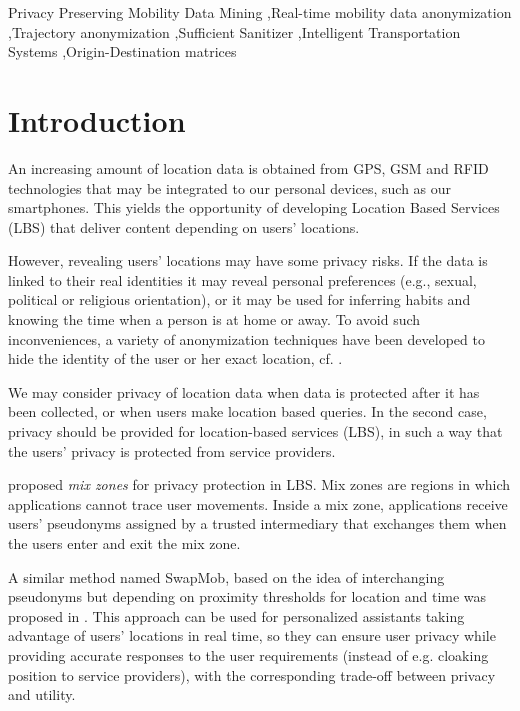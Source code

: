 \documentclass[times,twocolumn,final,authoryear]{elsarticle}
\begin{document}
\begin{frontmatter}
\begin{abstract}
\end{abstract}




\begin{keyword}
\KWD Privacy Preserving Mobility Data Mining \sep Real-time mobility data anonymization \sep Trajectory anonymization \sep Sufficient Sanitizer \sep Intelligent Transportation Systems \sep Origin-Destination matrices 
\end{keyword}

\end{frontmatter}


\section{Introduction}

An increasing amount of location data is obtained from GPS, GSM and RFID technologies that may be integrated to our personal devices, such as our smartphones. This yields the opportunity of developing Location Based Services (LBS) that deliver content depending on users' locations.

However, revealing users' locations may have some privacy risks. If the data is linked to their real identities it may reveal personal preferences (e.g., sexual, political or religious orientation), or it may be used for inferring habits and knowing the time when a person is at home or away.
To avoid such inconveniences, a variety of anonymization techniques have been developed to hide the identity of the user or her exact location, cf. \cite{Terrovitis:2011}.


We may consider privacy of location data when data is protected after it has been collected, or when users make location based queries. In the second case, privacy should be provided for location-based services (LBS), in such a way that the users' privacy is protected from service providers. 

\cite{Beresford2003} proposed \emph{mix zones} for privacy protection in LBS.
Mix zones are regions in which applications cannot trace user movements. 
Inside a mix zone, applications receive users' pseudonyms assigned by a trusted intermediary that exchanges
them when the users enter and exit the mix zone. 


A similar method named SwapMob, based on the idea of interchanging pseudonyms but depending on proximity thresholds for location and time was proposed in
\cite{Salas:2018-c}.
This approach can be used for personalized assistants taking advantage of users' locations in real time, so they can ensure user privacy while providing accurate responses to the user requirements (instead of e.g. cloaking position to service providers), with the corresponding trade-off between privacy and utility.
\end{document}
